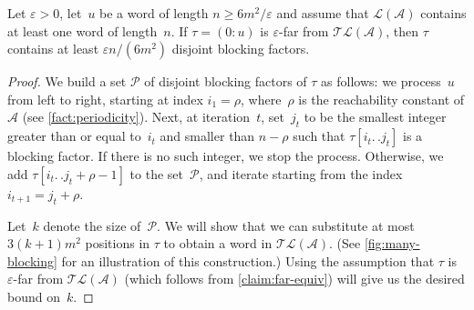 \documentclass[letterpaper, USenglish, cleveref, autoref, thm-restate, numberwithinsect]{lipics-v2021}
\theoremstyle{theorem}
\theoremstyle{definition}
\newcommand{\Aa}{\mathcal{A}}
\newcommand{\dd}{.\,.}
\newcommand{\eps}{\varepsilon}
\newcommand{\lang}[1]{\mathcal{L}(#1)}
\newcommand{\Pp}{\mathcal{P}}
\newcommand{\timedlang}[1]{\mathcal{TL}( #1 )}
\newcommand{\timedword}[2]{(#1:#2)}
\newcommand{\twu}{\timedword{0}{u}}
\begin{document}
\begin{lemma}\label{lemma:many-blocking}
    Let $\eps> 0$, let~$u$ be a word of length $n \ge 6m^2/\eps$ and assume that $\lang{\Aa}$ contains at least one word of length~$n$.
    If $\tau = \twu$ is $\eps$-far from $\timedlang{\Aa}$, then $\tau$ contains at least $\eps n/(6m^2)$ disjoint blocking factors.
\end{lemma}
\begin{proof}
    We build a set $\Pp$ of disjoint blocking factors of $\tau$ as follows: we process~$u$ from left to right, starting at index $i_1 = \rho$, where~$\rho$ is the reachability constant of $\Aa$ (see \cref{fact:periodicity}).
    Next, at iteration~$t$, set~$j_t$ to be the smallest integer greater than or equal to~$i_t$ and smaller than $n-\rho$ such that $\tau[i_t\dd  j_t]$ is a blocking factor. If there is no such integer, we stop the process.
    Otherwise, we add $\tau[i_t\dd  j_t+\rho-1]$ to the set~$\Pp$, and iterate starting from the index $i_{t+1} = j_t+\rho$.

    Let~$k$ denote the size of~$\Pp$. 
    We will show that we can substitute at most $3(k+1)m^2$ positions in $\tau$ to obtain a word in $\timedlang{\Aa}$. (See \cref{fig:many-blocking} for an illustration of this construction.)
    Using the assumption that $\tau$ is $\eps$-far from $\timedlang{\Aa}$ (which follows from \cref{claim:far-equiv}) will give us the desired bound on~$k$.


\end{proof}
\end{document}
